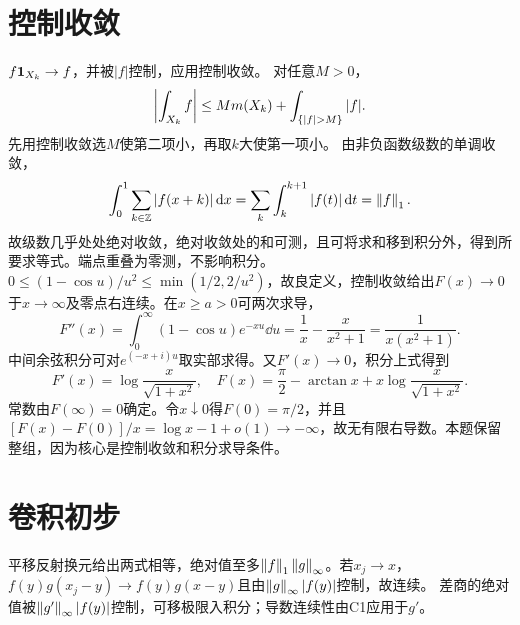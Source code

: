 \documentclass[UTF8,fontset=fandol,11pt]{ctexart}
\begin{document}
\section{控制收敛}
$f\mathbf1_{X_k}\to f$，并被$|f|$控制，应用控制收敛。
对任意$M>0$，
\[\abs{\int_{X_k}f}\le M m(X_k)+\int_{\{|f|>M\}}|f|.\]
先用控制收敛选$M$使第二项小，再取$k$大使第一项小。
由非负函数级数的单调收敛，
\[\int_0^1\sum_{k\in\mathbb Z}|f(x+k)|\,\mathrm d x=\sum_k\int_k^{k+1}|f(t)|\,\mathrm d t=\left\lVert f\right\rVert_1.\]
故级数几乎处处绝对收敛，绝对收敛处的和可测，且可将求和移到积分外，得到所要求等式。端点重叠为零测，不影响积分。
$0\le(1-\cos u)/u^2\le\min(1/2,2/u^2)$，故良定义，控制收敛给出$F(x)\to0$于$x\to\infty$及零点右连续。在$x\ge a>0$可两次求导，
\[F''(x)=\int_0^\infty(1-\cos u)e^{-xu}\dd u=\frac1x-\frac{x}{x^2+1}=\frac1{x(x^2+1)}.\]
中间余弦积分可对$e^{(-x+i)u}$取实部求得。又$F'(x)\to0$，积分上式得到
\[F'(x)=\log\frac{x}{\sqrt{1+x^2}},\quad F(x)=\frac\pi2-\arctan x+x\log\frac{x}{\sqrt{1+x^2}}.\]
常数由$F(\infty)=0$确定。令$x\downarrow0$得$F(0)=\pi/2$，并且$[F(x)-F(0)]/x=\log x-1+o(1)\to-\infty$，故无有限右导数。本题保留整组，因为核心是控制收敛和积分求导条件。
\section{卷积初步}
平移反射换元给出两式相等，绝对值至多$\left\lVert f\right\rVert_1\left\lVert g\right\rVert_\infty$。若$x_j\to x$，$f(y)g(x_j-y)\to f(y)g(x-y)$且由$\left\lVert g\right\rVert_\infty|f(y)|$控制，故连续。
差商的绝对值被$\left\lVert g'\right\rVert_\infty|f(y)|$控制，可移极限入积分；导数连续性由C1应用于$g'$。
\end{document}
